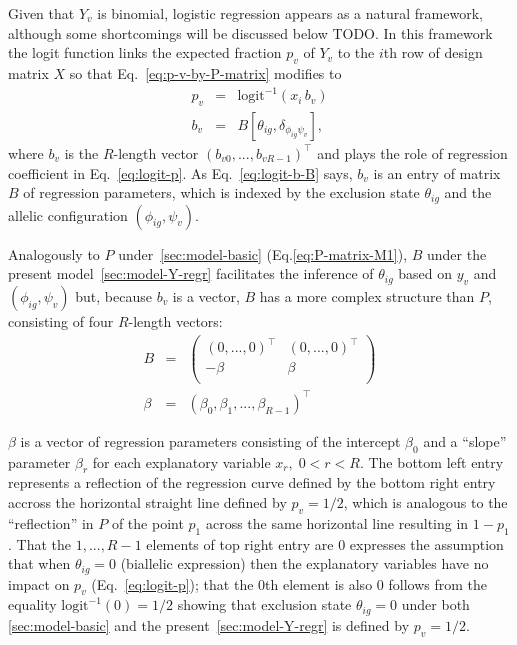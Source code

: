\documentclass[letterpaper]{article}
\begin{document}
Given that \(Y_v\) is binomial, logistic regression appears as a natural
framework, although some shortcomings will be discussed below TODO.  In this
framework the logit function links the expected fraction \(p_v\) of \(Y_v\) to
the \(i\)th row of design matrix \(X\) so that Eq.~\ref{eq:p-v-by-P-matrix}
modifies to
\begin{eqnarray}
\label{eq:logit-p}
p_v &=& \mathrm{logit}^{-1}(x_i\, b_v) \\
\label{eq:logit-b-B}
b_v &=& B[\theta_{ig},\delta_{\phi_{ig}\psi_v}],
\end{eqnarray}
where \(b_v\) is the
\(R\)-length vector \((b_{v0},...,b_{vR-1})^\top\) and plays the role of
regression coefficient in Eq.~\ref{eq:logit-p}. As Eq.~\ref{eq:logit-b-B}
says, \(b_v\) is an entry of matrix \(B\) of regression parameters,
which is indexed by the exclusion state \(\theta_{ig}\) and the allelic configuration
\((\phi_{ig},\psi_v)\).

Analogously to \(P\) under~\ref{sec:model-basic}
(Eq.\ref{eq:P-matrix-M1}), \(B\) under the present
model~\ref{sec:model-Y-regr} facilitates
the inference of \(\theta_{ig}\) based on \(y_v\) and \((\phi_{ig},\psi_v)\)
but, because \(b_v\) is a vector, \(B\) has a more complex structure than
\(P\), consisting of four \(R\)-length vectors:
\begin{eqnarray}
\label{eq:B-matrix-M2}
B &=&
\begin{pmatrix}
(0,...,0)^\top & (0,...,0)^\top \\
-\beta
&
\beta
\\
\end{pmatrix}
\\
\beta &=& (\beta_0,\beta_1,...,\beta_{R-1})^\top
\end{eqnarray}

\(\beta\) is a vector of regression parameters
consisting of the intercept \(\beta_0\) and a ``slope'' parameter
\(\beta_{r}\) for each explanatory variable \(x_r, \; 0<r<R\).
The bottom left entry represents a reflection of the regression curve defined
by the bottom right entry accross the horizontal straight line defined by \(p_v=1/2\),
which is analogous to the ``reflection'' in \(P\) of the point \(p_1\) across the same
horizontal line resulting in \(1-p_1\).
That the \(1,...,R-1\) elements of top right entry are \(0\) expresses the
assumption that when \(\theta_{ig}=0\) (biallelic expression) then the
explanatory variables have no impact on \(p_v\) (Eq.~\ref{eq:logit-p}); that
the \(0\)th element is also \(0\) follows from the equality
\(\mathrm{logit}^{-1}(0)=1/2\) showing that exclusion state \(\theta_{ig}=0\)
under both \ref{sec:model-basic} and the present~\ref{sec:model-Y-regr}
is defined by \(p_v=1/2\).
\end{document}
